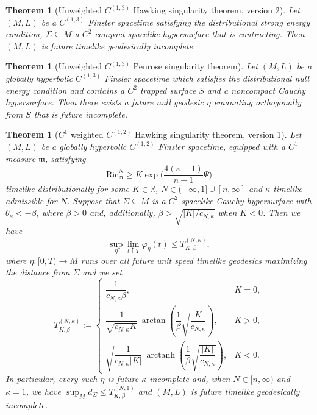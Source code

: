 \documentclass[a4paper,11pt]{article}
\numberwithin{equation}{section}
\theoremstyle{definition}
\theoremstyle{plain}
\newtheorem{Theorem}[Definition]{Theorem}
\newcommand{\R}{\mathbb R}
\newcommand{\Ric}{\mathrm{Ric}}
\newcommand{\m}{\mathfrak m}
\begin{document}
\begin{Theorem}[Unweighted $C^{(1,3)}$ Hawking singularity theorem, version 2]
Let $(M,L)$ be a $C^{(1,3)}$ Finsler spacetime satisfying the distributional strong energy condition, $\Sigma \subseteq M$ a $C^2$ compact spacelike hypersurface that is contracting. 
Then $(M,L)$ is future timelike geodesically incomplete.
\end{Theorem}

\begin{Theorem}[Unweighted $C^{(1,3)}$ Penrose singularity theorem]
Let $(M,L)$ be a globally hyperbolic $C^{(1,3)}$ Finsler spacetime which satisfies the distributional null energy condition and contains a $C^2$ trapped surface $S$ and a noncompact Cauchy hypersurface. 
Then there exists a future null geodesic $\eta$ emanating orthogonally from $S$ that is future incomplete.
\end{Theorem}

\begin{Theorem}[$C^1$ weighted $C^{(1,2)}$ Hawking singularity theorem, version 1]
Let $(M,L)$ be a globally hyperbolic $C^{(1,2)}$ Finsler spacetime, equipped with a $C^1$ measure $\mathfrak m$, satisfying 
\[
\Ric^N_\m \geq K\exp\biggl( \frac{4(\kappa-1)}{n-1}\Psi \biggr)
\]
timelike distributionally for some $K\in\R$, $N \in (-\infty,1] \cup [n,\infty]$ and $\kappa$ timelike admissible for $N$.
Suppose that $\Sigma\subseteq M$ is a $C^2$ spacelike Cauchy hypersurface with $\theta_\kappa <-\beta$, where $\beta>0$ and, additionally, $\beta>\sqrt{|K|/c_{N,\kappa}}$ when $K<0$.
Then we have
\[
\sup_\eta \lim_{t \uparrow T} \varphi_\eta(t) \leq T^{(N,\kappa)}_{K,\beta},
\]
where $\eta:[0,T) \to M$ runs over all future unit speed timelike geodesics maximizing the distance from $\Sigma$ and we set 
\[
    T^{(N,\kappa)}_{K,\beta}
    :=
    \begin{cases}
        \dfrac{1}{c_{N,\kappa}\beta},
        & K=0,\\[1.2ex]
        \dfrac{1}{\sqrt{c_{N,\kappa}K}}\,
        \arctan\!\left(
            \dfrac{1}{\beta}\sqrt{\dfrac{K}{c_{N,\kappa}}}
        \right),
        & K>0,\\[1.6ex]
        \sqrt{\dfrac{1}{c_{N,\kappa}|K|}}\,
        \operatorname{arctanh}\!\left(
            \dfrac{1}{\beta}\sqrt{\dfrac{|K|}{c_{N,\kappa}}}
        \right),
        & K<0.
    \end{cases}
\]
In particular, every such $\eta$ is future $\kappa$-incomplete and, when $N \in [n,\infty)$ and $\kappa=1$, we have $\sup_M d_\Sigma \le T^{(N,1)}_{K,\beta}$ and $(M,L)$ is future timelike geodesically incomplete.
\end{Theorem}
\end{document}
